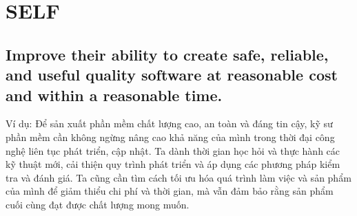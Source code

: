 \documentclass[14pt]{extarticle}
\begin{document}
\section{SELF}
\setcounter{subsection}{1}
\subsection{Improve their ability to create safe, reliable, and 
useful quality software at reasonable cost and within a
reasonable time.}
Ví dụ: Để sản xuất phần mềm chất lượng cao, an toàn và đáng tin cậy, 
kỹ sư phần mềm cần không ngừng nâng cao khả năng của mình trong 
thời đại công nghệ liên tục phát triển, cập nhật. Ta dành thời gian 
học hỏi và thực hành các kỹ thuật mới, cải thiện quy trình phát triển 
và áp dụng các phương pháp kiểm tra và đánh giá. Ta cũng cần tìm cách 
tối ưu hóa quá trình làm việc và sản phẩm của mình để giảm thiểu 
chi phí và thời gian, mà vẫn đảm bảo rằng sản phẩm cuối cùng đạt được 
chất lượng mong muốn.
\end{document}
